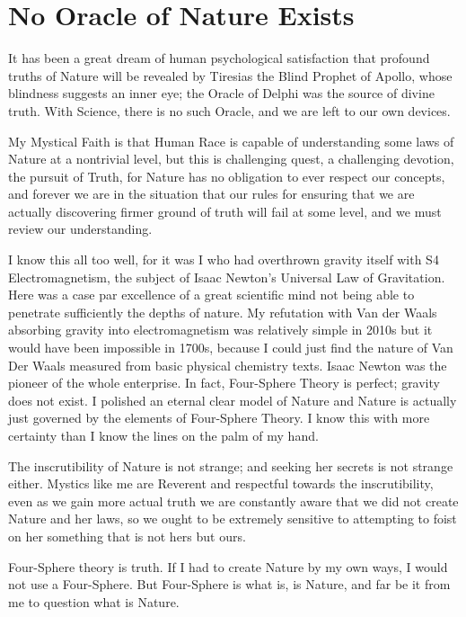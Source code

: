 \documentclass{amsart}
\begin{document}
\section{No Oracle of Nature Exists}

It has been a great dream of human psychological satisfaction that profound truths of Nature will be revealed by Tiresias the Blind Prophet of Apollo, whose blindness suggests an inner eye; the Oracle of Delphi was the source of divine truth.  With Science, there is no such Oracle, and we are left to our own devices.  

My Mystical Faith is that Human Race is capable of understanding some laws of Nature at a nontrivial level, but this is challenging quest, a challenging devotion, the pursuit of Truth, for Nature has no obligation to ever respect our concepts, and forever we are in the situation that our rules for ensuring that we are actually discovering firmer ground of truth will fail at some level, and we must review our understanding.  

I know this all too well, for it was I who had overthrown gravity itself with S4 Electromagnetism, the subject of Isaac Newton's Universal Law of Gravitation.  Here was a case par excellence of a great scientific mind not being able to penetrate sufficiently the depths of nature.  My refutation with Van der Waals absorbing gravity into electromagnetism was relatively simple in 2010s but it would have been impossible in 1700s, because I could just find the nature of Van Der Waals measured from basic physical chemistry texts.  Isaac Newton was the pioneer of the whole enterprise.  In fact, Four-Sphere Theory is perfect; gravity does not exist.  I polished an eternal clear model of Nature and Nature is actually just governed by the elements of Four-Sphere Theory.  I know this with more certainty than I know the lines on the palm of my hand.

The inscrutibility of Nature is not strange; and seeking her secrets is not strange either.  Mystics like me are Reverent and respectful towards the inscrutibility, even as we gain more actual truth we are constantly aware that we did not create Nature and her laws, so we ought to be extremely sensitive to attempting to foist on her something that is not hers but ours.  

Four-Sphere theory is truth.  If I had to create Nature by my own ways, I would not use a Four-Sphere.  But Four-Sphere is what is, is Nature, and far be it from me to question what is Nature.
\end{document}
